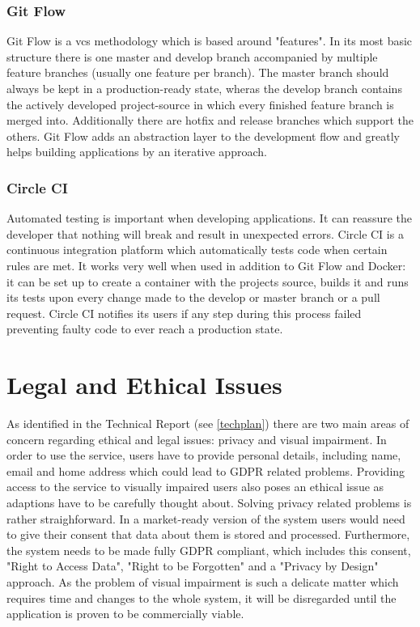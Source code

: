 \subsubsection{Git Flow}
Git Flow is a \acrshort{vcs} methodology which is based around "features". In its most basic structure there is one master and develop branch accompanied by multiple feature branches (usually one feature per branch). The master branch should always be kept in a production-ready state, wheras the develop branch contains the actively developed project-source in which every finished feature branch is merged into. Additionally there are hotfix and release branches which support the others. Git Flow adds an abstraction layer to the development flow and greatly helps building applications by an iterative approach.

\subsubsection{Circle CI} \label{ci}
Automated testing is important when developing applications. It can reassure the developer that nothing will break and result in unexpected errors. Circle CI is a continuous integration platform which automatically tests code when certain rules are met. It works very well when used in addition to Git Flow and Docker: it can be set up to create a container with the projects source, builds it and runs its tests upon every change made to the develop or master branch or a pull request. Circle CI notifies its users if any step during this process failed preventing faulty code to ever reach a production state.

\section{Legal and Ethical Issues}
As identified in the Technical Report (see \autoref{techplan}) there are two main areas of concern regarding ethical and legal issues: privacy and visual impairment. In order to use the service, users have to provide personal details, including name, email and home address which could lead to GDPR related problems. Providing access to the service to visually impaired users also poses an ethical issue as adaptions have to be carefully thought about. Solving privacy related problems is rather straighforward. In a market-ready version of the system users would need to give their consent that data about them is stored and processed. Furthermore, the system needs to be made fully GDPR compliant, which includes this consent, "Right to Access Data", "Right to be Forgotten" and a "Privacy by Design" approach. As the problem of visual impairment is such a delicate matter which requires time and changes to the whole system, it will be disregarded until the application is proven to be commercially viable.  